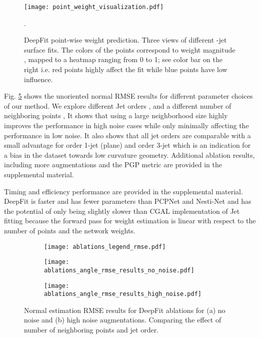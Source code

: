 \begin{figure}
\centering
	\texttt{[image: point\_weight\_visualization.pdf]}
	\caption{DeepFit point-wise weight prediction. Three views of different -jet surface fits. The colors of the points correspond to weight magnitude , mapped to a heatmap ranging from 0 to 1; see color bar on the right i.e. red points highly affect the fit while blue points have low influence.}.
	\label{figure:results_weights_visualiztion}
\end{figure}

Fig. \ref{fig:results:ablation} shows the unoriented normal RMSE results for different parameter choices of our method. We explore different Jet orders , and a different number of neighboring points , It shows that using a large neighborhood size highly improves the performance in high noise cases while only minimally affecting the performance in low noise. It also shows that all jet orders are comparable with a small advantage for order 1-jet (plane) and order 3-jet which is an indication for a bias in the dataset towards low curvature geometry. Additional ablation results, including more augmentations and the PGP metric are provided in the supplemental material.

Timing and efficiency performance are provided in the supplemental material. DeepFit is faster and has fewer parameters than PCPNet and Nesti-Net and has the potential of only being slightly slower than CGAL implementation of Jet fitting because the forward pass for weight estimation is linear with respect to the number of points and the network weights.

\begin{figure}[t]
    \centering
    	\begin{subfigure}{.98\textwidth}
    \centering
\texttt{[image: ablations\_legend\_rmse.pdf]}
    	\label{fig:results:ablations:b}
	\end{subfigure}

    \begin{subfigure}{.49\textwidth}
        \centering
    	\texttt{[image: ablations\_angle\_rmse\_results\_no\_noise.pdf]}
    	\caption{}
        \label{fig:results:ablations:a}
    \end{subfigure}
	\begin{subfigure}{.49\textwidth}
    \centering
\texttt{[image: ablations\_angle\_rmse\_results\_high\_noise.pdf]}
    	\caption{}
    	\label{fig:results:ablations:b}
	\end{subfigure}
	    \caption{Normal estimation RMSE results for DeepFit ablations for (a) no noise and (b) high noise augmentations. Comparing the effect of number of neighboring points and jet order.}
    
    \label{fig:results:ablation}
\end{figure}

